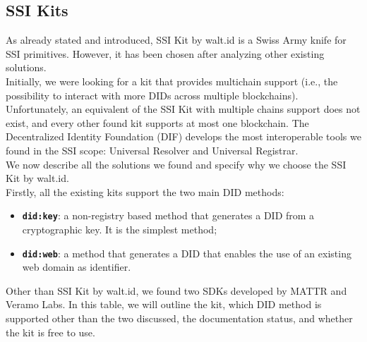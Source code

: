 \subsection{SSI Kits}
As already stated and introduced, SSI Kit by walt.id is a Swiss Army knife for SSI 
primitives. However, it has been chosen after analyzing other existing 
solutions.\\
Initially, we were looking for a kit that provides multichain support (i.e., the 
possibility to interact with more DIDs across multiple blockchains). 
Unfortunately, an equivalent of the SSI Kit with multiple chains support does not 
exist, and every other found kit supports at most one blockchain. The Decentralized 
Identity Foundation (DIF)\cite{site:dif} develops the most interoperable tools we found in the SSI
scope: Universal Resolver and Universal Registrar.\\
We now describe all the solutions we found and specify why we choose the SSI Kit by 
walt.id.
\vspace{0.35cm}\\
Firstly, all the existing kits support the two main DID methods:
\begin{itemize}
    \item \texttt{\textbf{did:key}}: a non-registry based method that generates a DID
    from a cryptographic key. It is the simplest method;
    \item \texttt{\textbf{did:web}}: a method that generates a DID that enables the 
    use of an existing web domain as identifier.
\end{itemize}
\label{otherSDKs}
Other than SSI Kit by walt.id, we found two SDKs developed by MATTR\cite{site:mattr}
and Veramo Labs\cite{site:veramo}.
In this table, we will outline the kit, which DID method is supported other than the 
two discussed, the documentation status, and whether the kit is free to use.
\renewcommand{\arraystretch}{1.75}
\vspace{0.1cm}\\

